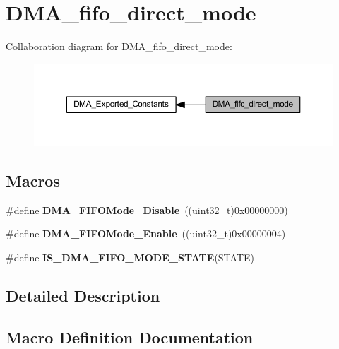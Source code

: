 \hypertarget{group___d_m_a__fifo__direct__mode}{}\section{D\+M\+A\+\_\+fifo\+\_\+direct\+\_\+mode}
\label{group___d_m_a__fifo__direct__mode}
Collaboration diagram for D\+M\+A\+\_\+fifo\+\_\+direct\+\_\+mode\+:\nopagebreak
\begin{figure}[H]
\begin{center}
\leavevmode
\includegraphics[width=350pt]{group___d_m_a__fifo__direct__mode}
\end{center}
\end{figure}
\subsection*{Macros}
\begin{DoxyCompactItemize}
\item 
\mbox{\label{group___d_m_a__fifo__direct__mode_gadad9e503fa9867a981e3090d333483d7}} 
\#define {\bfseries D\+M\+A\+\_\+\+F\+I\+F\+O\+Mode\+\_\+\+Disable}~((uint32\+\_\+t)0x00000000)
\item 
\mbox{\label{group___d_m_a__fifo__direct__mode_ga482bc2af420602d1a8c2aa35049a3857}} 
\#define {\bfseries D\+M\+A\+\_\+\+F\+I\+F\+O\+Mode\+\_\+\+Enable}~((uint32\+\_\+t)0x00000004)
\item 
\#define {\bfseries I\+S\+\_\+\+D\+M\+A\+\_\+\+F\+I\+F\+O\+\_\+\+M\+O\+D\+E\+\_\+\+S\+T\+A\+TE}(S\+T\+A\+TE)
\end{DoxyCompactItemize}


\subsection{Detailed Description}


\subsection{Macro Definition Documentation}
\mbox{\label{group___d_m_a__fifo__direct__mode_gadb90a893aeb49fd4bc14af750af3837c}} 
